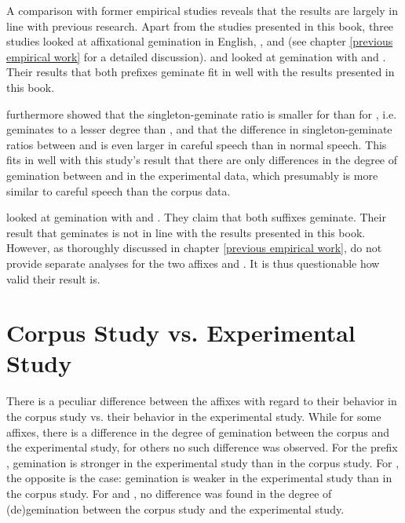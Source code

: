 A comparison with former empirical studies reveals that the results are largely in line with previous research. 
Apart from the studies presented in this book, three studies looked at affixational gemination in English, \cite{Kaye.2005}, \cite{Oh.2012} and \cite{Kotzor.2016} (see chapter \ref{previous empirical work} for a detailed discussion). 
\cite{Kaye.2005} and \cite{Oh.2012} looked at gemination with  and . Their results that both prefixes geminate fit in well with the results presented in this book.

\cite{Oh.2012} furthermore showed that the singleton-geminate ratio is smaller for  than for , i.e.  geminates to a lesser degree than , and that the difference in singleton-geminate ratios between  and  is even larger in careful speech than in normal speech. 
This fits in well with this study's result that there are only differences in the degree of gemination between  and  in the experimental data, which presumably is more similar to careful speech than the corpus data.

\cite{Kotzor.2016} looked at gemination with  and . They claim that both suffixes geminate. Their result that  geminates is not in line with the results presented in this book. However, as thoroughly discussed in chapter \ref{previous empirical work}, \cite{Kotzor.2016} do not provide separate analyses for the two affixes  and . It is thus questionable how valid their result is. 


\section{Corpus Study vs. Experimental Study}


There is a peculiar difference between the affixes with regard to their behavior in the corpus study vs. their behavior in the experimental study.
While for some affixes, there is a difference in the degree of gemination between the corpus and the experimental study, for others no such difference was observed. For the prefix , gemination is stronger in the experimental study than in the corpus study. For , the opposite is the case: gemination is weaker in the experimental study than in the corpus study. For  and , no difference was found in the degree of (de)gemination between the corpus study and the experimental study.

